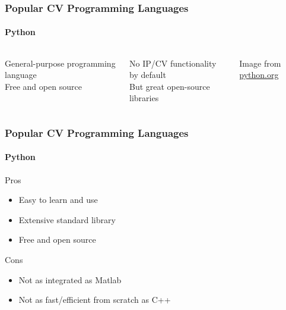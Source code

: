 \documentclass[xetex,professionalfont]{beamer}
\begin{document}

\begin{frame}
\frametitle{Popular CV Programming Languages}
\framesubtitle{Python}

\begin{columns}

General-purpose programming language \\
Free and open source %

\bigskip
No IP/CV functionality by default \\
But great open-source libraries


\begin{center}
{
	{\centering Image from \url{python.org}}}
\end{center}

\end{columns}

\end{frame}


\begin{frame}
\frametitle{Popular CV Programming Languages}
\framesubtitle{Python}

Pros
\begin{itemize}
	\item Easy to learn and use
	\item Extensive standard library
	\item Free and open source
\end{itemize}

\bigskip
Cons
\begin{itemize}
	\item Not as integrated as Matlab
	\item Not as fast/efficient from scratch as C++ %
\end{itemize}

\end{frame}

\end{document}
